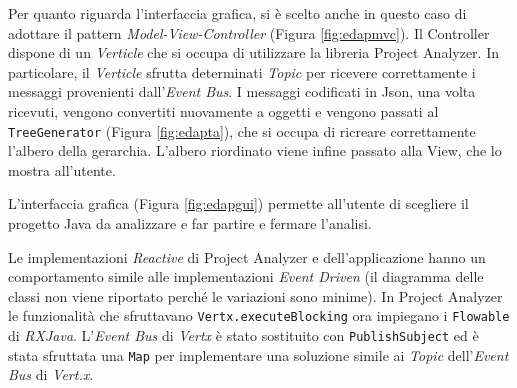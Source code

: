 \documentclass[12pt,a4paper,openright,twoside]{book}
\begin{document}
Per quanto riguarda l'interfaccia grafica, si è scelto anche in questo caso di adottare il pattern \textit{Model-View-Controller} (Figura \ref{fig:edapmvc}).
Il Controller dispone di un \textit{Verticle} che si occupa di utilizzare la libreria Project Analyzer.
In particolare, il \textit{Verticle} sfrutta determinati \textit{Topic} per ricevere correttamente i messaggi provenienti dall'\textit{Event Bus}.
I messaggi codificati in Json, una volta ricevuti, vengono convertiti nuovamente a oggetti e vengono passati al \texttt{TreeGenerator} (Figura \ref{fig:edapta}), che si occupa di ricreare correttamente l'albero della gerarchia.
L'albero riordinato viene infine passato alla View, che lo mostra all'utente.

L'interfaccia grafica (Figura \ref{fig:edapgui}) permette all'utente di scegliere il progetto Java da analizzare e far partire e fermare l'analisi.

Le implementazioni \textit{Reactive} di Project Analyzer e dell'applicazione hanno un comportamento simile alle implementazioni \textit{Event Driven} (il diagramma delle classi non viene riportato perché le variazioni sono minime).
In Project Analyzer le funzionalità che sfruttavano \texttt{Vertx.executeBlocking} ora impiegano i \texttt{Flowable} di \textit{RXJava}.
L'\textit{Event Bus} di \textit{Vertx} è stato sostituito con \texttt{PublishSubject} ed è stata sfruttata una \texttt{Map} per implementare una soluzione simile ai \textit{Topic} dell'\textit{Event Bus} di \textit{Vert.x}.
\end{document}
